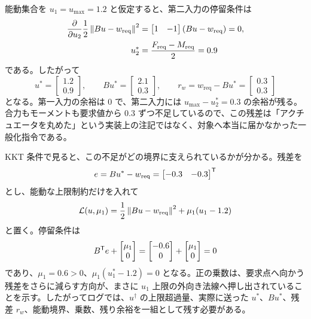 能動集合を $u_1=u_{\max}=1.2$ と仮定すると、第二入力の停留条件は
\begin{align}
  \frac{\partial}{\partial u_2}
  \frac{1}{2}\left\|Bu-w_{\mathrm{req}}\right\|^{2}
  &=
  \begin{bmatrix}1&-1\end{bmatrix}
  (Bu-w_{\mathrm{req}})=0,\\
  u_2^*&=\frac{F_{\mathrm{req}}-M_{\mathrm{req}}}{2}=0.9
\end{align}
である。したがって
\begin{equation}
  u^*=
  \begin{bmatrix}
    1.2\\0.9
  \end{bmatrix},
  \qquad
  Bu^*=
  \begin{bmatrix}
    2.1\\0.3
  \end{bmatrix},
  \qquad
  r_w=w_{\mathrm{req}}-Bu^*
  =
  \begin{bmatrix}
    0.3\\0.3
  \end{bmatrix}
\end{equation}
となる。第一入力の余裕は 0 で、第二入力には $u_{\max}-u_2^*=0.3$ の余裕が残る。合力もモーメントも要求値から $0.3$ ずつ不足しているので、この残差は「アクチュエータを丸めた」という実装上の注記ではなく、対象へ本当に届かなかった一般化指令である。

KKT 条件で見ると、この不足がどの境界に支えられているかが分かる。残差を
\begin{equation}
  e=Bu^*-w_{\mathrm{req}}
  =
  \begin{bmatrix}
    -0.3&-0.3
  \end{bmatrix}^{\mathsf{T}}
\end{equation}
とし、能動な上限制約だけを入れて
\begin{equation}
  \mathcal{L}(u,\mu_1)
  =
  \frac{1}{2}\left\|Bu-w_{\mathrm{req}}\right\|^{2}
  +\mu_1(u_1-1.2)
\end{equation}
と置く。停留条件は
\begin{equation}
  B^{\mathsf{T}} e+
  \begin{bmatrix}
    \mu_1\\0
  \end{bmatrix}
  =
  \begin{bmatrix}
    -0.6\\0
  \end{bmatrix}
  +
  \begin{bmatrix}
    \mu_1\\0
  \end{bmatrix}
  =0
\end{equation}
であり、$\mu_1=0.6>0$、$\mu_1(u_1^*-1.2)=0$ となる。正の乗数は、要求点へ向かう残差をさらに減らす方向が、まさに $u_1$ 上限の外向き法線へ押し出されていることを示す。したがってログでは、$u^\dagger$ の上限超過量、実際に送った $u^*$、$Bu^*$、残差 $r_w$、能動境界、乗数、残り余裕を一組として残す必要がある。

